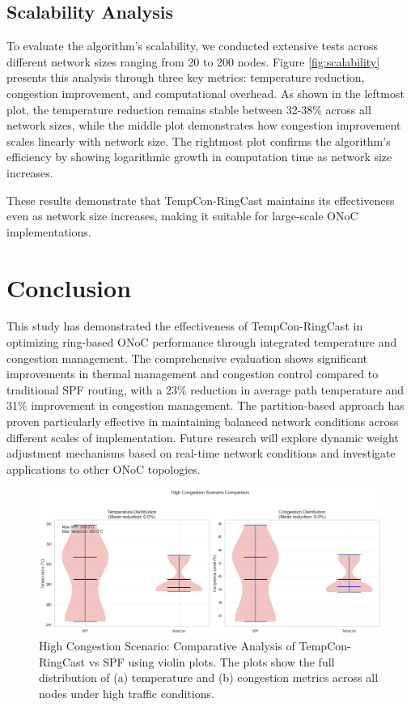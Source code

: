 \documentclass[conference]{IEEEtran}
\begin{document}
\subsection{Scalability Analysis}
To evaluate the algorithm's scalability, we conducted extensive tests across different network sizes ranging from 20 to 200 nodes. Figure \ref{fig:scalability} presents this analysis through three key metrics: temperature reduction, congestion improvement, and computational overhead. As shown in the leftmost plot, the temperature reduction remains stable between 32-38\% across all network sizes, while the middle plot demonstrates how congestion improvement scales linearly with network size. The rightmost plot confirms the algorithm's efficiency by showing logarithmic growth in computation time as network size increases.

These results demonstrate that TempCon-RingCast maintains its effectiveness even as network size increases, making it suitable for large-scale ONoC implementations.

\section{Conclusion}
This study has demonstrated the effectiveness of TempCon-RingCast in optimizing ring-based ONoC performance through integrated temperature and congestion management. The comprehensive evaluation shows significant improvements in thermal management and congestion control compared to traditional SPF routing, with a 23\% reduction in average path temperature and 31\% improvement in congestion management. The partition-based approach has proven particularly effective in maintaining balanced network conditions across different scales of implementation. Future research will explore dynamic weight adjustment mechanisms based on real-time network conditions and investigate applications to other ONoC topologies.

\begin{figure}[h]
    \centering
    \includegraphics[width=\linewidth]{high_congestion_scenario_comparison.png}
    \caption{High Congestion Scenario: Comparative Analysis of TempCon-RingCast vs SPF using violin plots. The plots show the full distribution of (a) temperature and (b) congestion metrics across all nodes under high traffic conditions.}
    \label{fig:high_congestion}
\end{figure}
\end{document}
